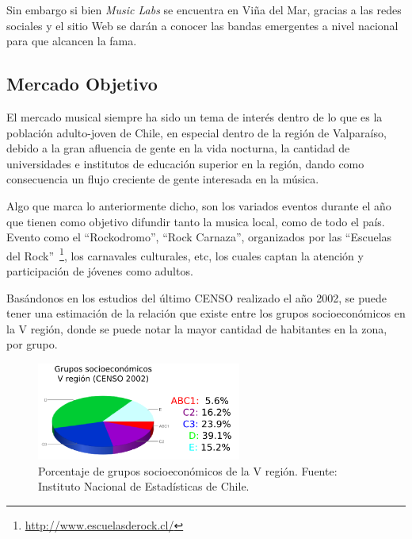 Sin embargo si bien \emph{Music Labs} se encuentra en Viña del Mar,
gracias a las redes sociales y el sitio Web se darán a conocer las bandas emergentes a nivel nacional
para que alcancen la fama.


\subsection{Mercado Objetivo}

El mercado musical siempre ha sido un tema de interés dentro de lo que es la población adulto-joven de Chile,
en especial dentro de la región de Valparaíso, debido a la gran afluencia de gente en la vida nocturna,
la cantidad de universidades e institutos de educación superior en la región,
dando como consecuencia un flujo creciente de gente interesada en la música.

Algo que marca lo anteriormente dicho, son los variados eventos durante el año que tienen como objetivo
difundir tanto la musica local, como de todo el país. Evento como el ``Rockodromo'', ``Rock Carnaza'',
organizados por las ``Escuelas del Rock''~\footnote{\url{http://www.escuelasderock.cl/}},
los carnavales culturales, etc, los cuales captan la atención y participación de jóvenes como
adultos.

Basándonos en los estudios del último CENSO realizado el año 2002,
se puede tener una estimación de la relación que existe entre los grupos socioeconómicos
en la V región, donde se puede notar la mayor cantidad de habitantes en la zona, por grupo.

\begin{figure}[h!]
    \centering
	\includegraphics[width=0.6\textwidth]{img/grupos_soc}
  \caption[Porcentaje de grupos socioeconómicos de la V región]{Porcentaje de
  grupos socioeconómicos de la V región. Fuente: Instituto Nacional de
  Estadísticas de Chile.}
\end{figure}



